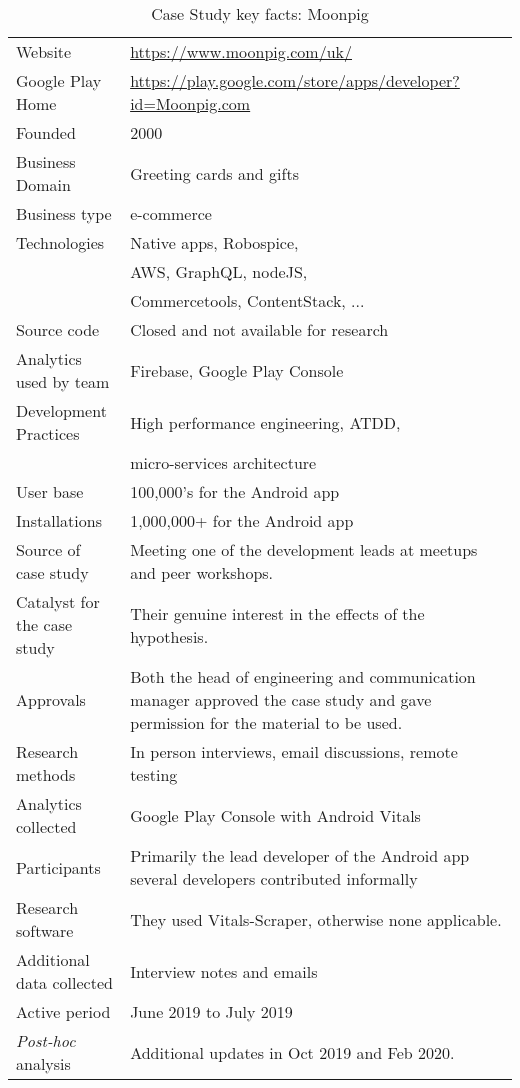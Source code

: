 \begin{table*}[h]
    \centering
    \renewcommand{\arraystretch}{0.8}%
    \small
    \setlength{\tabcolsep}{6pt}
    \begin{tabular}{L{5cm} L{10cm}}
       \toprule
       Website &\url{https://www.moonpig.com/uk/} \\
       Google Play Home & \url{https://play.google.com/store/apps/developer?id=Moonpig.com} \\
       Founded &2000 \\
       Business Domain & Greeting cards and gifts \\
       Business type & e-commerce \\
       Technologies  & Native apps, Robospice, \\
       & AWS, GraphQL, nodeJS, \\
       & Commercetools, ContentStack, ... \\
       Source code  &Closed and not available for research \\
       Analytics used by team &Firebase, Google Play Console \\
       Development Practices & High performance engineering, ATDD, \\
         & micro-services architecture \\
       \midrule
       User base &100,000's for the Android app\\
       Installations &1,000,000+ for the Android app\\
       \midrule
       Source of case study &Meeting one of the development leads at meetups and peer workshops. \\
       Catalyst for the case study & Their genuine interest in the effects of the hypothesis. \\
       Approvals &Both the head of engineering and communication manager approved the case study and gave permission for the material to be used. \\
       \midrule
       Research methods &In person interviews, email discussions, remote testing \\
       Analytics collected &Google Play Console with Android Vitals \\
       Participants &Primarily the lead developer of the Android app several developers contributed informally \\
       Research software &They used Vitals-Scraper, otherwise none applicable.\\
       Additional data collected &Interview notes and emails \\
       Active period &June 2019 to July 2019 \\
       \midrule
       \emph{Post-hoc} analysis & Additional updates in Oct 2019 and Feb 2020. \\
       \bottomrule
    \end{tabular}
    \caption{Case Study key facts: Moonpig}
    \label{tab:moonpig_anaytics_overview}
\end{table*}

